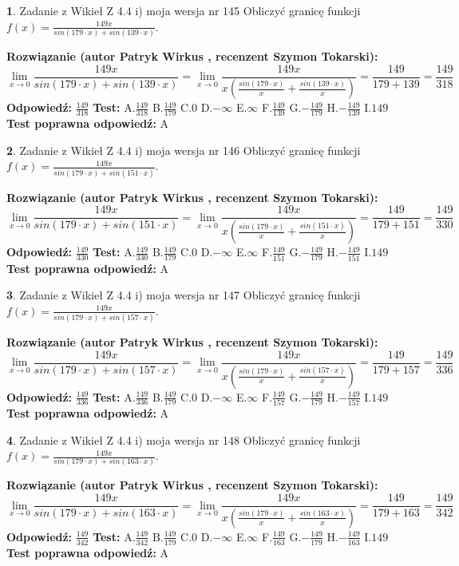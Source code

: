 \documentclass[12pt, a4paper]{article}
\theoremstyle{definition} %
\newtheorem{zad}{}
\newcommand{\zadStart}[1]{\begin{zad}#1\newline}
\newcommand{\zadStop}{\end{zad}}
\newcommand{\rozwStart}[2]{\noindent \textbf{Rozwiązanie (autor #1 , recenzent #2): }\newline}
\newcommand{\rozwStop}{\newline}
\newcommand{\odpStart}{\noindent \textbf{Odpowiedź:}\newline}
\newcommand{\odpStop}{\newline}
\newcommand{\testStart}{\noindent \textbf{Test:}\newline}
\newcommand{\testStop}{\newline}
\newcommand{\kluczStart}{\noindent \textbf{Test poprawna odpowiedź:}\newline}
\newcommand{\kluczStop}{\newline}
\begin{document}
\zadStart{Zadanie z Wikieł Z 4.4 i) moja wersja nr 145}
Obliczyć granicę funkcji $f(x)=\frac{149x}{sin(179\cdot x) +sin(139\cdot x)}$.
\zadStop
\rozwStart{Patryk Wirkus}{Szymon Tokarski}
$$\lim\limits_{x\to 0}\frac{149x}{sin(179\cdot x) +sin(139\cdot x)}=\lim\limits_{x\to 0}\frac{149x}{x(\frac{sin(179\cdot x)}{x}+\frac{sin(139\cdot x)}{x})}=\frac{149}{179+139} = \frac{149}{318}$$
\rozwStop
\odpStart
$\frac{149}{318}$
\odpStop
\testStart
A.$\frac{149}{318}$
B.$\frac{149}{179}$
C.$0$
D.$-\infty$
E.$\infty$
F.$\frac{149}{139}$
G.$-\frac{149}{179}$
H.$-\frac{149}{139}$
I.$149$
\testStop
\kluczStart
A
\kluczStop



\zadStart{Zadanie z Wikieł Z 4.4 i) moja wersja nr 146}
Obliczyć granicę funkcji $f(x)=\frac{149x}{sin(179\cdot x) +sin(151\cdot x)}$.
\zadStop
\rozwStart{Patryk Wirkus}{Szymon Tokarski}
$$\lim\limits_{x\to 0}\frac{149x}{sin(179\cdot x) +sin(151\cdot x)}=\lim\limits_{x\to 0}\frac{149x}{x(\frac{sin(179\cdot x)}{x}+\frac{sin(151\cdot x)}{x})}=\frac{149}{179+151} = \frac{149}{330}$$
\rozwStop
\odpStart
$\frac{149}{330}$
\odpStop
\testStart
A.$\frac{149}{330}$
B.$\frac{149}{179}$
C.$0$
D.$-\infty$
E.$\infty$
F.$\frac{149}{151}$
G.$-\frac{149}{179}$
H.$-\frac{149}{151}$
I.$149$
\testStop
\kluczStart
A
\kluczStop



\zadStart{Zadanie z Wikieł Z 4.4 i) moja wersja nr 147}
Obliczyć granicę funkcji $f(x)=\frac{149x}{sin(179\cdot x) +sin(157\cdot x)}$.
\zadStop
\rozwStart{Patryk Wirkus}{Szymon Tokarski}
$$\lim\limits_{x\to 0}\frac{149x}{sin(179\cdot x) +sin(157\cdot x)}=\lim\limits_{x\to 0}\frac{149x}{x(\frac{sin(179\cdot x)}{x}+\frac{sin(157\cdot x)}{x})}=\frac{149}{179+157} = \frac{149}{336}$$
\rozwStop
\odpStart
$\frac{149}{336}$
\odpStop
\testStart
A.$\frac{149}{336}$
B.$\frac{149}{179}$
C.$0$
D.$-\infty$
E.$\infty$
F.$\frac{149}{157}$
G.$-\frac{149}{179}$
H.$-\frac{149}{157}$
I.$149$
\testStop
\kluczStart
A
\kluczStop



\zadStart{Zadanie z Wikieł Z 4.4 i) moja wersja nr 148}
Obliczyć granicę funkcji $f(x)=\frac{149x}{sin(179\cdot x) +sin(163\cdot x)}$.
\zadStop
\rozwStart{Patryk Wirkus}{Szymon Tokarski}
$$\lim\limits_{x\to 0}\frac{149x}{sin(179\cdot x) +sin(163\cdot x)}=\lim\limits_{x\to 0}\frac{149x}{x(\frac{sin(179\cdot x)}{x}+\frac{sin(163\cdot x)}{x})}=\frac{149}{179+163} = \frac{149}{342}$$
\rozwStop
\odpStart
$\frac{149}{342}$
\odpStop
\testStart
A.$\frac{149}{342}$
B.$\frac{149}{179}$
C.$0$
D.$-\infty$
E.$\infty$
F.$\frac{149}{163}$
G.$-\frac{149}{179}$
H.$-\frac{149}{163}$
I.$149$
\testStop
\kluczStart
A
\kluczStop
\end{document}
